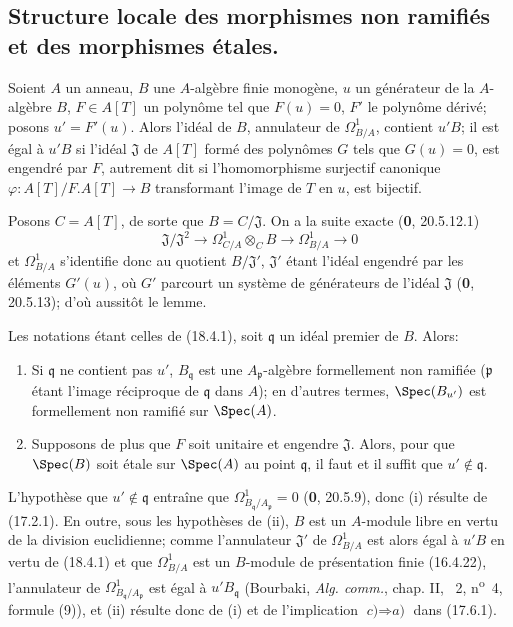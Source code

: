 
\subsection{Structure locale des morphismes non ramifiés et des morphismes étales.}

\begin{lemma}[18.4.1]
\label{IV.18.4.1}
Soient $A$ un anneau, $B$ une $A$-algèbre finie monogène, $u$ un générateur de la $A$-algèbre $B$, $F\in A[T]$ un polynôme tel que $F(u)=0$, $F'$ le polynôme dérivé; posons $u'=F'(u)$. Alors l'idéal de $B$, annulateur de $\Omega^1_{B/A}$, contient $u'B$; il est égal à $u'B$ si l'idéal $\mathfrak J$ de $A[T]$ formé des polynômes $G$ tels que $G(u)=0$, est engendré par $F$, autrement dit si l'homomorphisme surjectif canonique $\varphi:A[T]/F.A[T]\to B$ transformant l'image de $T$ en $u$, est bijectif.
\end{lemma}

Posons $C=A[T]$, de sorte que $B=C/\mathfrak J$. On a la suite exacte (\textbf{0}, 20.5.12.1)
\[
  \mathfrak J/\mathfrak J^2\longrightarrow\Omega^1_{C/A}\otimes_C B\longrightarrow\Omega^1_{B/A}\longrightarrow 0
\]
et $\Omega^1_{B/A}$ s'identifie donc au quotient $B/\mathfrak J'$, $\mathfrak J'$ étant l'idéal engendré par les éléments $G'(u)$, où $G'$ parcourt un système de générateurs de l'idéal $\mathfrak J$ (\textbf{0}, 20.5.13); d'où aussitôt le lemme.

\begin{proposition}[18.4.2]
\label{IV.18.4.2}
Les notations étant celles de \textup{(18.4.1)}, soit $\mathfrak q$ un idéal premier de $B$. Alors:
\begin{enumerate}
  \item[\textup{(i)}] Si $\mathfrak q$ ne contient pas $u'$, $B_{\mathfrak q}$ est une $A_{\mathfrak p}$-algèbre formellement non ramifiée \textup{(}$\mathfrak p$ étant l'image réciproque de $\mathfrak q$ dans $A$\textup{)}; en d'autres termes, $\Spec(B_{u'})$ est formellement non ramifié sur $\Spec(A)$.
  \item[\textup{(ii)}] Supposons de plus que $F$ soit unitaire et engendre $\mathfrak J$. Alors, pour que $\Spec(B)$ soit étale sur $\Spec(A)$ au point $\mathfrak q$, il faut et il suffit que $u'\notin\mathfrak q$.
\end{enumerate}
\end{proposition}

L'hypothèse que $u'\notin\mathfrak q$ entraîne que $\Omega^1_{B_{\mathfrak q}/A_{\mathfrak p}}=0$ (\textbf{0}, 20.5.9), donc (i) résulte de (17.2.1). En outre, sous les hypothèses de (ii), $B$ est un $A$-module libre en vertu de la division euclidienne; comme l'annulateur $\mathfrak J'$ de $\Omega^1_{B/A}$ est alors égal à $u'B$ en vertu de (18.4.1) et que $\Omega^1_{B/A}$ est un $B$-module de présentation finie (16.4.22), l'annulateur de $\Omega^1_{B_{\mathfrak q}/A_{\mathfrak p}}$ est égal à $u'B_{\mathfrak q}$ (Bourbaki, \emph{Alg. comm.}, chap. II, \textsection~2, n\textsuperscript{o}~4, formule (9)), et (ii) résulte donc de (i) et de l'implication $\textit{c)}\Rightarrow\textit{a)}$ dans (17.6.1).

